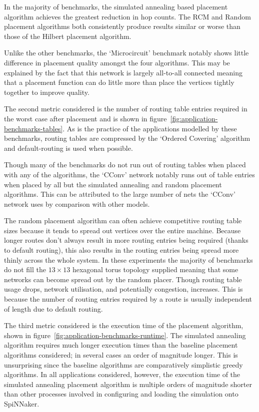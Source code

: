 				In the majority of benchmarks, the simulated annealing based placement
				algorithm achieves the greatest reduction in hop counts. The RCM and
				Random placement algorithms both consistently produce results similar
				or worse than those of the Hilbert placement algorithm.
				
				Unlike the other benchmarks, the `Microcircuit' benchmark notably shows
				little difference in placement quality amongst the four algorithms.
				This may be explained by the fact that this network is largely
				all-to-all connected meaning that a placement function can do little
				more than place the vertices tightly together to improve quality.
				
				The second metric considered is the number of routing table entries
				required in the worst case after placement and is shown in
				figure~\ref{fig:application-benchmarks-tables}. As is the practice of
				the applications modelled by these benchmarks, routing tables are
				compressed by the `Ordered Covering' algorithm~\cite{mundy16} and
				default-routing is used when possible.
				
				Though many of the benchmarks do not run out of routing tables when
				placed with any of the algorithms, the `CConv' network notably runs out
				of table entries when placed by all but the simulated annealing and
				random placement algorithms. This can be attributed to the large number
				of nets the `CConv' network uses by comparison with other models.
				
				The random placement algorithm can often achieve competitive routing
				table sizes because it tends to spread out vertices over the entire
				machine. Because longer routes don't always result in more routing
				entries being required (thanks to default routing), this also results
				in the routing entries being spread more thinly across the whole
				system. In these experiments the majority of benchmarks do not fill the
				$13\times13$ hexagonal torus topology supplied meaning that some
				networks can become spread out by the random placer. Though routing
				table usage drops, network utilisation, and potentially congestion,
				increases. This is because the number of routing entries required by a
				route is usually independent of length due to default routing.
				
				The third metric considered is the execution time of the placement
				algorithm, shown in figure~\ref{fig:application-benchmarks-runtime}.
				The simulated annealing algorithm requires much longer execution times
				than the baseline placement algorithms considered; in several cases an
				order of magnitude longer. This is unsurprising since the baseline
				algorithms are comparatively simplistic greedy algorithms. In all
				applications considered, however, the execution time of the simulated
				annealing placement algorithm is multiple orders of magnitude shorter
				than other processes involved in configuring and loading the simulation
				onto SpiNNaker.
				
